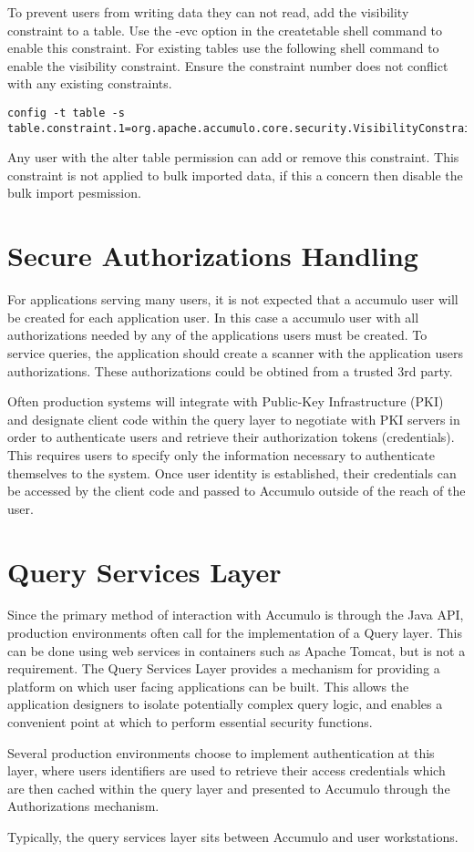 To prevent users from writing data they can not read, add the visibility
constraint to a table.  Use the -evc option in the createtable shell command to
enable this constraint.  For existing tables use the following shell command to
enable the visibility constraint.  Ensure the constraint number does not
conflict with any existing constraints.
  
\small
\begin{verbatim}
config -t table -s table.constraint.1=org.apache.accumulo.core.security.VisibilityConstraint
\end{verbatim}
\normalsize

Any user with the alter table permission can add or remove this constraint.
This constraint is not applied to bulk imported data, if this a concern then
disable the bulk import pesmission.

\section{Secure Authorizations Handling}

For applications serving many users, it is not expected that a accumulo user
will be created for each application user.  In this case a accumulo user with
all authorizations needed by any of the applications users must be created.  To
service queries, the application should create a scanner with the application
users authorizations.  These authorizations could be obtined from a trusted 3rd
party.

Often production systems will integrate with Public-Key Infrastructure (PKI) and
designate client code within the query layer to negotiate with PKI servers in order
to authenticate users and retrieve their authorization tokens (credentials). This
requires users to specify only the information necessary to authenticate themselves
to the system. Once user identity is established, their credentials can be accessed by
the client code and passed to Accumulo outside of the reach of the user.

\section{Query Services Layer}

Since the primary method of interaction with Accumulo is through the Java API,
production environments often call for the implementation of a Query layer. This
can be done using web services in containers such as Apache Tomcat, but is not a
requirement. The Query Services Layer provides a mechanism for providing a
platform on which user facing applications can be built. This allows the application
designers to isolate potentially complex query logic, and enables a convenient point
at which to perform essential security functions.

Several production environments choose to implement authentication at this layer,
where users identifiers are used to retrieve their access credentials which are then
cached within the query layer and presented to Accumulo through the
Authorizations mechanism.

Typically, the query services layer sits between Accumulo and user workstations.
